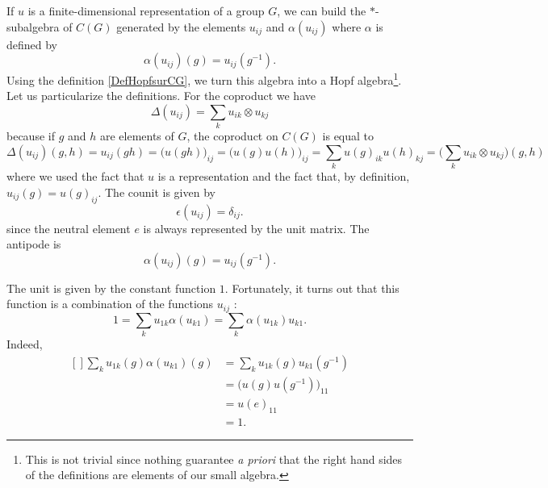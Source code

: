 If $u$ is a finite-dimensional representation of a group $G$, we can build the $*$-subalgebra of $C(G)$ generated by the elements $u_{ij}$ and $\alpha(u_{ij})$ where $\alpha$ is defined by
\begin{equation}
    \alpha(u_{ij})(g)=u_{ij}(g^{-1}).
\end{equation}
Using the definition \ref{DefHopfsurCG}, we turn this algebra into a Hopf algebra\footnote{This is not trivial since nothing guarantee \emph{a priori} that the right hand sides of the definitions are elements of our small algebra.}. Let us particularize the definitions. For the coproduct we have
\begin{equation}
    \Delta(u_{ij})=\sum_k u_{ik}\otimes u_{kj}
\end{equation}
because if $g$ and $h$ are elements of $G$, the coproduct on $C(G)$ is equal to
\begin{equation}
    \Delta(u_{ij})(g,h)=u_{ij}(gh)=\big( u(gh) \big)_{ij}=\big( u(g)u(h) \big)_{ij}=\sum_k u(g)_{ik}u(h)_{kj}=\Big( \sum_k u_{ik}\otimes u_{kj}\Big)(g,h)
\end{equation}
where we used the fact that $u$ is a representation and the fact that, by definition, $u_{ij}(g)=u(g)_{ij}$. The counit is given by
\begin{equation}
    \epsilon(u_{ij})=\delta_{ij}.
\end{equation}
since the neutral element $e$ is always represented by the unit matrix. The antipode is 
\begin{equation}
    \alpha(u_{ij})(g)=u_{ij}(g^{-1}).
\end{equation}

The unit is given by the constant function $1$. Fortunately, it turns out that this function is a combination of the functions $u_{ij}$ :
\begin{equation}
    1=\sum_k u_{1k}\alpha(u_{k1})=\sum_k\alpha(u_{1k})u_{k1}.
\end{equation}
Indeed,
\begin{equation}
    \begin{aligned}[]
        \sum_ku_{1k}(g)\alpha(u_{k1})(g)&=\sum_ku_{1k}(g)u_{k1}(g^{-1})  \\
        &=\Big( u(g)u(g^{-1}) \Big)_{11}\\
        &=u(e)_{11}\\
        &=1.
    \end{aligned}
\end{equation}


